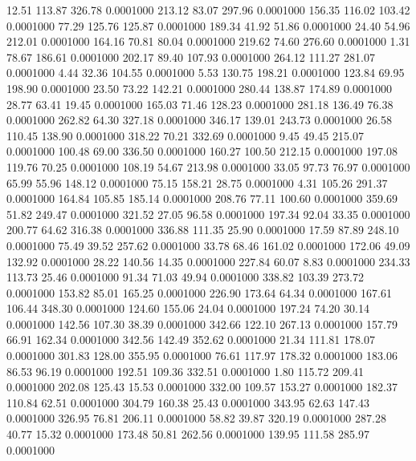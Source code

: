   12.51  113.87  326.78   0.0001000
 213.12   83.07  297.96   0.0001000
 156.35  116.02  103.42   0.0001000
  77.29  125.76  125.87   0.0001000
 189.34   41.92   51.86   0.0001000
  24.40   54.96  212.01   0.0001000
 164.16   70.81   80.04   0.0001000
 219.62   74.60  276.60   0.0001000
   1.31   78.67  186.61   0.0001000
 202.17   89.40  107.93   0.0001000
 264.12  111.27  281.07   0.0001000
   4.44   32.36  104.55   0.0001000
   5.53  130.75  198.21   0.0001000
 123.84   69.95  198.90   0.0001000
  23.50   73.22  142.21   0.0001000
 280.44  138.87  174.89   0.0001000
  28.77   63.41   19.45   0.0001000
 165.03   71.46  128.23   0.0001000
 281.18  136.49   76.38   0.0001000
 262.82   64.30  327.18   0.0001000
 346.17  139.01  243.73   0.0001000
  26.58  110.45  138.90   0.0001000
 318.22   70.21  332.69   0.0001000
   9.45   49.45  215.07   0.0001000
 100.48   69.00  336.50   0.0001000
 160.27  100.50  212.15   0.0001000
 197.08  119.76   70.25   0.0001000
 108.19   54.67  213.98   0.0001000
  33.05   97.73   76.97   0.0001000
  65.99   55.96  148.12   0.0001000
  75.15  158.21   28.75   0.0001000
   4.31  105.26  291.37   0.0001000
 164.84  105.85  185.14   0.0001000
 208.76   77.11  100.60   0.0001000
 359.69   51.82  249.47   0.0001000
 321.52   27.05   96.58   0.0001000
 197.34   92.04   33.35   0.0001000
 200.77   64.62  316.38   0.0001000
 336.88  111.35   25.90   0.0001000
  17.59   87.89  248.10   0.0001000
  75.49   39.52  257.62   0.0001000
  33.78   68.46  161.02   0.0001000
 172.06   49.09  132.92   0.0001000
  28.22  140.56   14.35   0.0001000
 227.84   60.07    8.83   0.0001000
 234.33  113.73   25.46   0.0001000
  91.34   71.03   49.94   0.0001000
 338.82  103.39  273.72   0.0001000
 153.82   85.01  165.25   0.0001000
 226.90  173.64   64.34   0.0001000
 167.61  106.44  348.30   0.0001000
 124.60  155.06   24.04   0.0001000
 197.24   74.20   30.14   0.0001000
 142.56  107.30   38.39   0.0001000
 342.66  122.10  267.13   0.0001000
 157.79   66.91  162.34   0.0001000
 342.56  142.49  352.62   0.0001000
  21.34  111.81  178.07   0.0001000
 301.83  128.00  355.95   0.0001000
  76.61  117.97  178.32   0.0001000
 183.06   86.53   96.19   0.0001000
 192.51  109.36  332.51   0.0001000
   1.80  115.72  209.41   0.0001000
 202.08  125.43   15.53   0.0001000
 332.00  109.57  153.27   0.0001000
 182.37  110.84   62.51   0.0001000
 304.79  160.38   25.43   0.0001000
 343.95   62.63  147.43   0.0001000
 326.95   76.81  206.11   0.0001000
  58.82   39.87  320.19   0.0001000
 287.28   40.77   15.32   0.0001000
 173.48   50.81  262.56   0.0001000
 139.95  111.58  285.97   0.0001000
